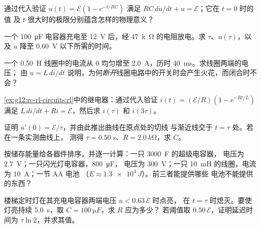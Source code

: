 \begin{exercise}[$\star\star$]\label{exo:g12:rc-rl-circuits:7}
通过代入验证 $u(t) = \mathcal{E}(1 - e^{-t/RC})$
满足 $RC\,du/dt + u = \mathcal{E}$；它在 $t = 0$ 时的值
及 $t$ 很大时的极限分别蕴含怎样的物理意义？
\end{exercise}

\begin{exercise}[$\star\star$]\label{exo:g12:rc-rl-circuits:8}
一个 \qty{100}{\micro F} 电容器充电至 \qty{12}{V} 后，经
\qty{47}{k\ohm} 的电阻放电。求 $\tau$、$u(\tau)$，以及 $u$ 降至
\qty{0.60}{V} 以下所需的时间。
\end{exercise}

\begin{exercise}[$\star\star$]\label{exo:g12:rc-rl-circuits:9}
一个 \qty{0.50}{H} 线圈中的电流从 $0$ 均匀增至
\qty{2.0}{A}，历时 \qty{40}{ms}。求线圈两端的电压；
由 $u = L\,di/dt$ 说明，为何\emph{断开}线圈电路中的开关时会产生火花，而闭合时不会？
\end{exercise}

\begin{exercise}[$\star\star$]\label{exo:g12:rc-rl-circuits:10}
\cref{ex:g12:rc-rl-circuits:rl}中的继电器：通过代入验证
$i(t) = (\mathcal{E}/R)(1 - e^{-Rt/L})$ 满足
$L\,di/dt + Ri = \mathcal{E}$，然后求 $i(\tau)$ 和 $i(3\tau)$。
\end{exercise}

\begin{exercise}[$\star\star$]\label{exo:g12:rc-rl-circuits:11}
证明 $u'(0) = \mathcal{E}/\tau$，并由此推出曲线在原点处的切线
与渐近线交于 $t = \tau$ 处。若在一条实测曲线上，
测得 $\tau = \qty{0.50}{s}$、$R = \qty{2.0}{k\ohm}$，求 $C$。
\end{exercise}

\begin{exercise}[$\star\star\star$]\label{exo:g12:rc-rl-circuits:12}
按储存能量给各器件排序，并逐一计算：一只 \qty{3000}{F} 的超级电容器，
电压为 \qty{2.7}{V}；一只闪光灯电容器，\qty{800}{\micro F}，
电压为 \qty{300}{V}；一只 \qty{10}{mH} 的线圈，电流为 \qty{10}{A}；一节 AA 电池
（$E \approx \qty{1.3e4}{J}$）。前三者能提供哪些
电池不能提供的东西？
\end{exercise}

\begin{exercise}[$\star\star\star$]\label{exo:g12:rc-rl-circuits:13}
楼梯定时灯在其充电电容器两端电压 $u < 0.63\,\mathcal{E}$ 时点亮，
在 $t = \tau$ 时熄灭。要使灯亮持续
\qty{5.0}{s}，取 $C = \qty{100}{\micro F}$，求 $R$ 应为多少？
若阈值取 $0.50\,\mathcal{E}$，证明延迟时间为 $\tau \ln 2$，并求其值。
\end{exercise}

